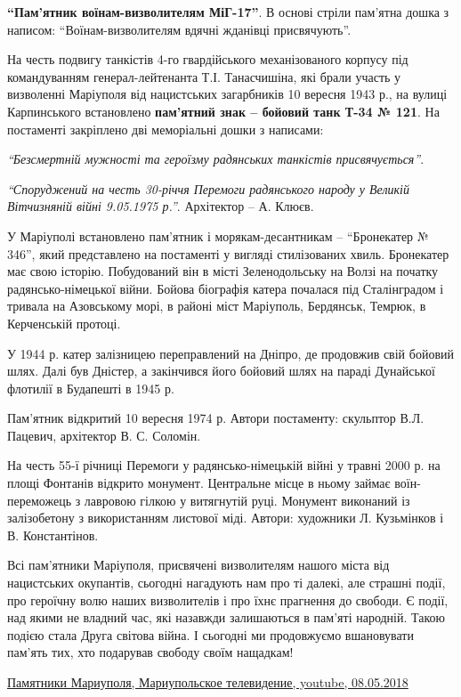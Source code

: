 \textbf{\enquote{Пам'ятник воїнам-визволителям МіГ-17}}. В основі стріли пам'ятна дошка з
написом: \enquote{Воїнам-визволителям вдячні жданівці присвячують}.


На честь подвигу танкістів 4-го гвардійського механізованого корпусу під
командуванням генерал-лейтенанта Т.І. Танасчишіна, які брали участь у
визволенні Маріуполя від нацистських загарбників 10 вересня 1943 р.,  на вулиці
Карпинського встановлено \textbf{пам'ятний знак – бойовий танк Т-34 № 121}. На
постаменті закріплено дві меморіальні дошки з написами:

\emph{\enquote{Безсмертній мужності та героїзму радянських танкістів присвячується}}.

\emph{\enquote{Споруджений на честь 30-річчя Перемоги радянського народу у Великій
Вітчизняній війні 9.05.1975 р.}}. Архітектор – А. Клюєв.


У Маріуполі встановлено пам'ятник і морякам-десантникам – \enquote{Бронекатер № 346},
який представлено на постаменті у вигляді стилізованих хвиль. Бронекатер має
свою історію. Побудований він в місті Зеленодольську на Волзі на початку
радянсько-німецької війни. Бойова біографія катера почалася під Сталінградом і
тривала на Азовському морі, в районі міст Маріуполь, Бердянськ, Темрюк, в
Керченській протоці.

У 1944 р. катер залізницею переправлений на Дніпро, де продовжив свій бойовий
шлях. Далі був Дністер, а закінчився його бойовий шлях на параді Дунайської
флотилії в Будапешті в 1945 р.

Пам'ятник відкритий 10 вересня 1974 р. Автори постаменту: скульптор В.Л.
Пацевич, архітектор В. С. Соломін.


На честь 55-ї річниці Перемоги у радянсько-німецькій війні у травні 2000 р. на
площі Фонтанів відкрито монумент. Центральне місце в ньому займає
воїн-переможець з лавровою гілкою у витягнутій руці. Монумент виконаний із
залізобетону з використанням листової міді. Автори: художники Л. Кузьмінков і
В. Константінов.


Всі пам'ятники Маріуполя, присвячені визволителям нашого міста від нацистських
окупантів, сьогодні нагадують нам про ті далекі, але страшні події, про
героїчну волю наших визволителів і про їхнє прагнення до свободи. Є події, над
якими не владний час, які назавжди залишаються в пам'яті народній. Такою подією
стала Друга світова війна. І сьогодні ми продовжуємо вшановувати пам'ять тих,
хто подарував свободу своїм нащадкам! 

\href{https://youtu.be/czLn_KCfByU}{%
Памятники Мариуполя, Мариупольское телевидение, youtube, 08.05.2018%
}

